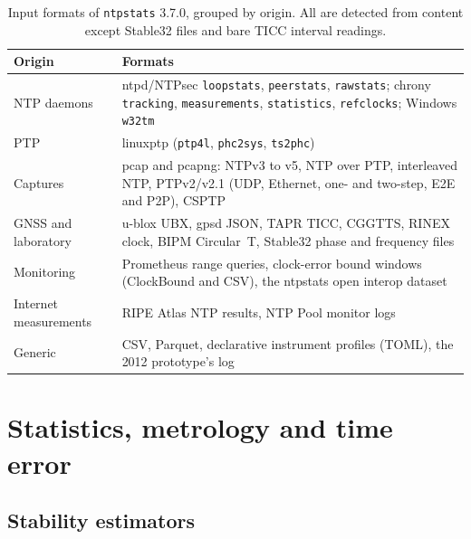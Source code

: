 \documentclass[11pt,a4paper]{article}
\newcommand{\ntp}{\texttt{ntpstats}}
\begin{document}
\begin{table}[t]
\centering\small
\caption{Input formats of \ntp{} 3.7.0, grouped by origin. All are detected from content except
Stable32 files and bare TICC interval readings.}\label{tab:inputs}
\begin{tabularx}{\linewidth}{@{}lX@{}}
\toprule
Origin & Formats \\
\midrule
NTP daemons & ntpd/NTPsec \texttt{loopstats}, \texttt{peerstats}, \texttt{rawstats}; chrony \texttt{tracking},
  \texttt{measurements}, \texttt{statistics}, \texttt{refclocks}; Windows \texttt{w32tm} \\
PTP & linuxptp (\texttt{ptp4l}, \texttt{phc2sys}, \texttt{ts2phc}) \\
Captures & pcap and pcapng: NTPv3 to v5, NTP over PTP, interleaved NTP, PTPv2/v2.1 (UDP, Ethernet,
  one- and two-step, E2E and P2P), CSPTP \\
GNSS and laboratory & u-blox UBX, gpsd JSON, TAPR TICC, CGGTTS, RINEX clock, BIPM Circular~T,
  Stable32 phase and frequency files \\
Monitoring & Prometheus range queries, clock-error bound windows (ClockBound \citep{clockbound} and
  CSV), the ntpstats open interop dataset \\
Internet measurements & RIPE Atlas NTP results, NTP Pool monitor logs \\
Generic & CSV, Parquet, declarative instrument profiles (TOML), the 2012 prototype's log \\
\bottomrule
\end{tabularx}
\end{table}

\section{Statistics, metrology and time error}\label{sec:stats}

\subsection{Stability estimators}
\end{document}
